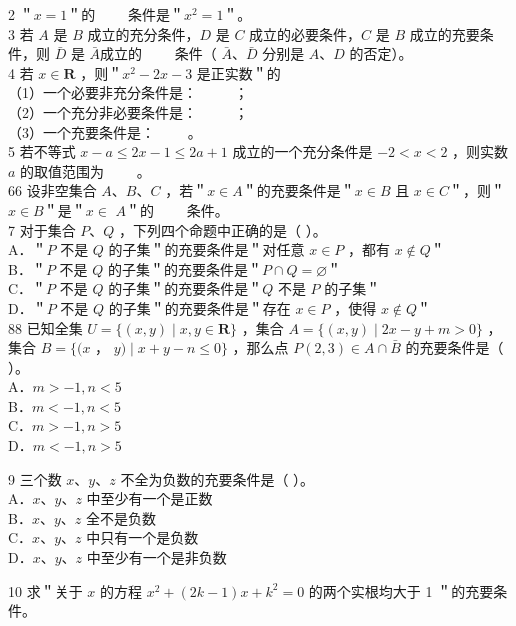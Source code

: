 \documentclass[10pt]{article}
\begin{document}
2 ＂\(x=1\)＂的 \(\qquad\)条件是＂\(x^{2}=1\)＂。\\
3 若 \(A\) 是 \(B\) 成立的充分条件，\(D\) 是 \(C\) 成立的必要条件，\(C\) 是 \(B\) 成立的充要条件，则 \(\bar{D}\) 是 \(\bar{A}\)成立的 \(\qquad\)条件（ \(\bar{A} 、 \bar{D}\) 分别是 \(A 、 D\) 的否定）。\\
4 若 \(x \in \mathbf{R}\) ，则＂\(x^{2}-2 x-3\) 是正实数＂的\\
（1）一个必要非充分条件是： \(\qquad\) ；\\
（2）一个充分非必要条件是： \(\qquad\) ；\\
（3）一个充要条件是： \(\qquad\)。\\
5 若不等式 \(x-a \leqslant 2 x-1 \leqslant 2 a+1\) 成立的一个充分条件是 \(-2<x<2\) ，则实数 \(a\) 的取值范围为 \(\qquad\)。\\
66 设非空集合 \(A 、 B 、 C\) ，若＂\(x \in A\)＂的充要条件是＂\(x \in B\) 且 \(x \in C\)＂，则＂\(x \in B\)＂是＂\(x \in\) \(A\)＂的 \(\qquad\)条件。\\
7 对于集合 \(P 、 Q\) ，下列四个命题中正确的是（ ）。\\
A．＂\(P\) 不是 \(Q\) 的子集＂的充要条件是＂对任意 \(x \in P\) ，都有 \(x \notin Q\)＂\\
B．＂\(P\) 不是 \(Q\) 的子集＂的充要条件是＂\(P \cap Q=\varnothing\)＂\\
C．＂\(P\) 不是 \(Q\) 的子集＂的充要条件是＂\(Q\) 不是 \(P\) 的子集＂\\
D．＂\(P\) 不是 \(Q\) 的子集＂的充要条件是＂存在 \(x \in P\) ，使得 \(x \notin Q\)＂\\
88 已知全集 \(U=\{(x, y) \mid x, y \in \mathbf{R}\}\) ，集合 \(A=\{(x, y) \mid 2 x-y+m>0\}\) ，集合 \(B=\{(x\) ， \(y) \mid x+y-n \leqslant 0\}\) ，那么点 \(P(2,3) \in A \cap \bar{B}\) 的充要条件是（ ）。\\
A．\(m>-1, n<5\)\\
B．\(m<-1, n<5\)\\
C．\(m>-1, n>5\)\\
D．\(m<-1, n>5\)

9 三个数 \(x 、 y 、 z\) 不全为负数的充要条件是（ ）。\\
A．\(x 、 y 、 z\) 中至少有一个是正数\\
B．\(x 、 y 、 z\) 全不是负数\\
C．\(x 、 y 、 z\) 中只有一个是负数\\
D．\(x 、 y 、 z\) 中至少有一个是非负数

10 求＂关于 \(x\) 的方程 \(x^{2}+(2 k-1) x+k^{2}=0\) 的两个实根均大于 1 ＂的充要条件。
\end{document}

